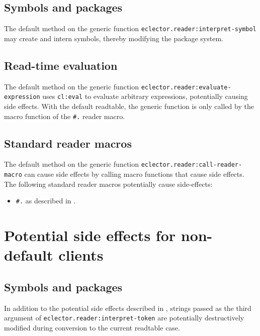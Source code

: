 \subsection{Symbols and packages}
\label{sec:default-symbols-and-packages}

The default method on the generic function
\texttt{eclector.reader:interpret-symbol} may create and intern
symbols, thereby modifying the package system.

\subsection{Read-time evaluation}
\label{sec:default-read-time-evaluation}

The default method on the generic function
\texttt{eclector.reader:evaluate-expression} uses \texttt{cl:eval} to
evaluate arbitrary expressions, potentially causing side effects.
With the default readtable, the generic function is only called by the
macro function of the \texttt{\#.} reader macro.

\subsection{Standard reader macros}
\label{sec:default-standard-reader-macros}

The default method on the generic function
\texttt{eclector.reader:call-reader-macro} can cause side effects by
calling macro functions that cause side effects.  The following
standard reader macros potentially cause side-effects:

\begin{itemize}
\item \texttt{\#.} as described in .
\end{itemize}

\section{Potential side effects for non-default clients}
\label{sec:side-effects-non-default-clients}

\subsection{Symbols and packages}
\label{sec:non-default-symbols-and-packages}

In addition to the potential side effects described in
, strings passed as the third
argument of \texttt{eclector.reader:interpret-token} are potentially
destructively modified during conversion to the current readtable
case.

